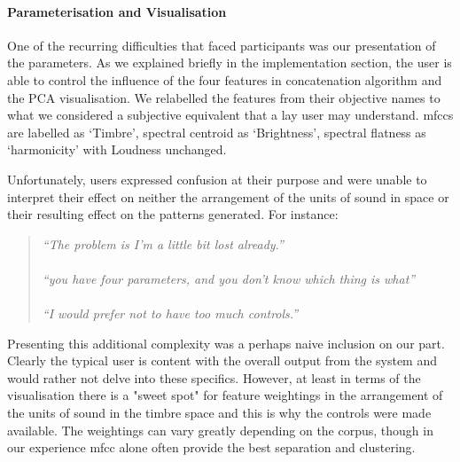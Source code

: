 \paragraph{Parameterisation and Visualisation}

One of the recurring difficulties that faced participants was our presentation of the parameters. As we explained briefly in the implementation section, the user is able to control the influence of the four features in concatenation algorithm and the PCA visualisation. We relabelled the features from their objective names to what we considered a subjective equivalent that a lay user may understand. \acrshort{mfcc}s are labelled as `Timbre', spectral centroid as `Brightness', spectral flatness as `harmonicity' with Loudness unchanged.  

Unfortunately, users expressed confusion at their purpose and were unable to interpret their effect on neither the arrangement of the units of sound in space or their resulting effect on the patterns generated. For instance:

\blockquote{\textit{
“The problem is I'm a little bit lost already.”\\\\
“you have four parameters, and you don't know which thing is what”\\\\
“I would prefer not to have too much controls.”
}}

Presenting this additional complexity was a perhaps naive inclusion on our part. Clearly the typical user is content with the overall output from the system and would rather not delve into these specifics. However, at least in terms of the visualisation there is a "sweet spot" for feature weightings in the arrangement of the units of sound in the timbre space and this is why the controls were made available. The weightings can vary greatly depending on the corpus, though in our experience \acrshort{mfcc} alone often provide the best separation and clustering.

